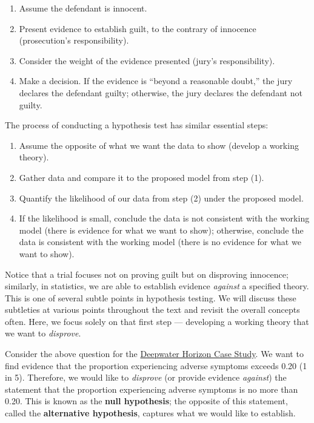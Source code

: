 \documentclass[
]{book}
\providecommand{\tightlist}{%
  \setlength{\itemsep}{0pt}\setlength{\parskip}{0pt}}
\theoremstyle{plain}
\theoremstyle{mydefn}
\theoremstyle{myexmpl}
\theoremstyle{remark}
\begin{document}
\begin{enumerate}
\def\labelenumi{\arabic{enumi}.}
\tightlist
\item
  Assume the defendant is innocent.
\item
  Present evidence to establish guilt, to the contrary of innocence (prosecution's responsibility).
\item
  Consider the weight of the evidence presented (jury's responsibility).
\item
  Make a decision. If the evidence is ``beyond a reasonable doubt,'' the jury declares the defendant guilty; otherwise, the jury declares the defendant not guilty.
\end{enumerate}

The process of conducting a hypothesis test has similar essential steps:

\begin{enumerate}
\def\labelenumi{\arabic{enumi}.}
\tightlist
\item
  Assume the opposite of what we want the data to show (develop a working theory).
\item
  Gather data and compare it to the proposed model from step (1).
\item
  Quantify the likelihood of our data from step (2) under the proposed model.
\item
  If the likelihood is small, conclude the data is not consistent with the working model (there is evidence for what we want to show); otherwise, conclude the data is consistent with the working model (there is no evidence for what we want to show).
\end{enumerate}

Notice that a trial focuses not on proving guilt but on disproving innocence; similarly, in statistics, we are able to establish evidence \emph{against} a specified theory. This is one of several subtle points in hypothesis testing. We will discuss these subtleties at various points throughout the text and revisit the overall concepts often. Here, we focus solely on that first step --- developing a working theory that we want to \emph{disprove}.

Consider the above question for the \protect\hyperlink{CaseDeepwater}{Deepwater Horizon Case Study}. We want to find evidence that the proportion experiencing adverse symptoms exceeds 0.20 (1 in 5). Therefore, we would like to \emph{disprove} (or provide evidence \emph{against}) the statement that the proportion experiencing adverse symptoms is no more than 0.20. This is known as the \textbf{null hypothesis}; the opposite of this statement, called the \textbf{alternative hypothesis}, captures what we would like to establish.
\end{document}
